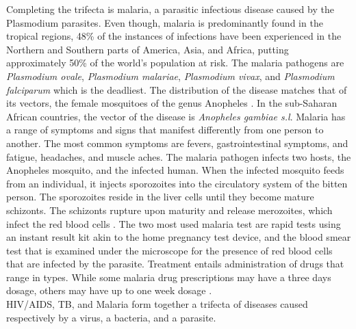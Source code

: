 Completing the trifecta is malaria, a parasitic infectious disease caused by the Plasmodium parasites. Even though, malaria is predominantly found in the tropical regions, 48\% of the instances of infections have been experienced in the Northern and Southern parts of America, Asia, and Africa, putting approximately 50\% of the world’s population at risk. The malaria pathogens are \textit{Plasmodium ovale}, \textit{Plasmodium malariae}, \textit{Plasmodium vivax}, and \textit{Plasmodium falciparum} which is the deadliest. The distribution of the disease matches that of its vectors, the female mosquitoes of the genus Anopheles \cite{sinka_global_2012,snow_global_2005}. In the sub-Saharan African countries, the vector of the disease is \textit{Anopheles gambiae s.l}. Malaria has a range of symptoms and signs that manifest differently from one person to another. The most common symptoms are fevers, gastrointestinal symptoms, and fatigue, headaches, and muscle aches. The malaria pathogen infects two hosts, the Anopheles mosquito, and the infected human. When the infected mosquito feeds from an individual, it injects sporozoites into the circulatory system of the bitten person. The sporozoites reside in the liver cells until they become mature schizonts. The schizonts rupture upon maturity and release merozoites, which infect the red blood cells \cite{james_new_1937}. The two most used malaria test are rapid tests using an instant result kit akin to the home pregnancy test device, and the blood smear test that is examined under the microscope for the presence of red blood cells that are infected by the parasite. Treatment entails administration of drugs that range in types. While some malaria drug prescriptions may have a three days dosage, others may have up to one week dosage \cite{alonso_malaria_1993,battle_treatment-seeking_2016}.\\
HIV/AIDS, TB, and Malaria form together a trifecta of diseases caused respectively by a virus, a bacteria, and a parasite.

